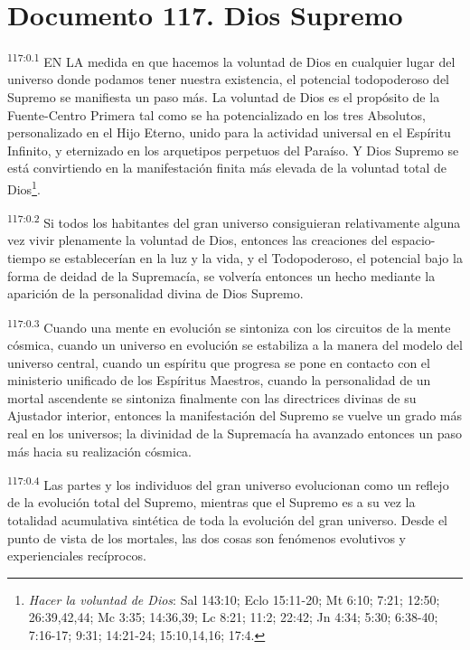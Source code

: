 \documentclass[twoside, 11pt]{book}
\begin{document}
\chapter{Documento 117. Dios Supremo}
\par
\textsuperscript{117:0.1} EN LA medida en que hacemos la voluntad de Dios en cualquier lugar del universo donde podamos tener nuestra existencia, el potencial todopoderoso del Supremo se manifiesta un paso más. La voluntad de Dios es el propósito de la Fuente-Centro Primera tal como se ha potencializado en los tres Absolutos, personalizado en el Hijo Eterno, unido para la actividad universal en el Espíritu Infinito, y eternizado en los arquetipos perpetuos del Paraíso. Y Dios Supremo se está convirtiendo en la manifestación finita más elevada de la voluntad total de Dios\footnote{\textit{Hacer la voluntad de Dios}: Sal 143:10; Eclo 15:11-20; Mt 6:10; 7:21; 12:50; 26:39,42,44; Mc 3:35; 14:36,39; Lc 8:21; 11:2; 22:42; Jn 4:34; 5:30; 6:38-40; 7:16-17; 9:31; 14:21-24; 15:10,14,16; 17:4.}.

\par
\textsuperscript{117:0.2} Si todos los habitantes del gran universo consiguieran relativamente alguna vez vivir plenamente la voluntad de Dios, entonces las creaciones del espacio-tiempo se establecerían en la luz y la vida, y el Todopoderoso, el potencial bajo la forma de deidad de la Supremacía, se volvería entonces un hecho mediante la aparición de la personalidad divina de Dios Supremo.

\par
\textsuperscript{117:0.3} Cuando una mente en evolución se sintoniza con los circuitos de la mente cósmica, cuando un universo en evolución se estabiliza a la manera del modelo del universo central, cuando un espíritu que progresa se pone en contacto con el ministerio unificado de los Espíritus Maestros, cuando la personalidad de un mortal ascendente se sintoniza finalmente con las directrices divinas de su Ajustador interior, entonces la manifestación del Supremo se vuelve un grado más real en los universos; la divinidad de la Supremacía ha avanzado entonces un paso más hacia su realización cósmica.

\par
\textsuperscript{117:0.4} Las partes y los individuos del gran universo evolucionan como un reflejo de la evolución total del Supremo, mientras que el Supremo es a su vez la totalidad acumulativa sintética de toda la evolución del gran universo. Desde el punto de vista de los mortales, las dos cosas son fenómenos evolutivos y experienciales recíprocos.
\end{document}
